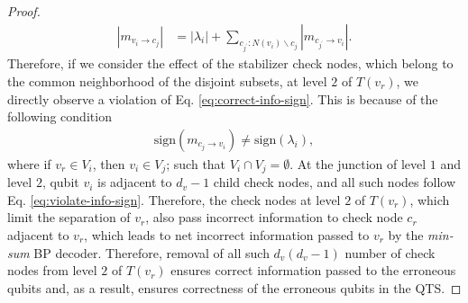 \documentclass[10pt,a4paper]{amsart}
\begin{document}
\begin{proof}
\begin{align}
        |m_{v_i \rightarrow c_j}| &= |\lambda_i| + \sum_{c_{j^\prime}:N(v_i)\backslash c_j}|m_{c_{j^{\prime}}\rightarrow v_i}|.
    \end{align}
    Therefore, if we consider the effect of the stabilizer check nodes, which belong to the common neighborhood of the disjoint subsets, at level $2$ of $T(v_r)$, we directly observe a violation of Eq. \eqref{eq:correct-info-sign}.
    This is because of the following condition
    \begin{align}
        \mathrm{sign}(m_{c_j \rightarrow v_i}) \neq \mathrm{sign}(\lambda_i),
        \label{eq:violate-info-sign}
    \end{align}
    where if $v_r \in V_i$, then $v_i \in V_j$; such that $V_i \cap V_j = \emptyset$.
    At the junction of level $1$ and level $2$, qubit $v_i$ is adjacent to $d_v - 1$ child check nodes, and all such nodes follow Eq. \eqref{eq:violate-info-sign}.
    Therefore, the check nodes at level $2$ of $T(v_r)$, which limit the separation of $v_r$, also pass incorrect information to check node $c_r$ adjacent to $v_r$, which leads to net incorrect information passed to $v_r$ by the \textit{min-sum} BP decoder.
    Therefore, removal of all such $d_v(d_v - 1)$ number of check nodes from level $2$ of $T(v_r)$ ensures correct information passed to the erroneous qubits and, as a result, ensures correctness of the erroneous qubits in the QTS.
\end{proof}
\end{document}

